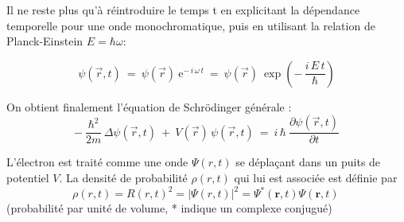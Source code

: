 \documentclass[openany]{book}
\begin{document}
Il ne reste plus qu'\`a r\'eintroduire le temps t en explicitant la d\'ependance temporelle pour une onde monochromatique, puis en utilisant la relation de Planck-Einstein $E = \hbar \omega$:

$$
\psi(\vec{r},t) \ = \ \psi(\vec{r}) \ \mathrm{e}^{- \, i \, \omega \, t} \ = \ \psi(\vec{r}) \ \exp \left( - \, \frac{i \, E \, t}{\hbar} \right)
$$

On obtient finalement l'\'equation de Schr\"odinger g\'en\'erale :
$$
- \ \frac{\hbar^2}{2m} \, \Delta \psi(\vec{r},t) \ + \ V(\vec{r}) \, \psi(\vec{r},t) \ = \ i \, \hbar \ \frac{\partial \psi(\vec{r},t)}{\partial t}
$$


L'\'electron est trait\'e comme une onde $\Psi(r,t)$ se d\'epla\c cant dans un puits de potentiel $V$.
La densit\'e de probabilit\'e $\rho(r,t)$ qui lui est associ\'ee est d\'efinie par
$$
\rho(r,t)= R(r,t)^2 = |\Psi(r,t)|^2=\Psi^*(\mathbf{r},t)\Psi(\mathbf{r},t)\,\!
$$
(probabilit\'e par unit\'e de volume, * indique un complexe conjugu\'e)
\end{document}
